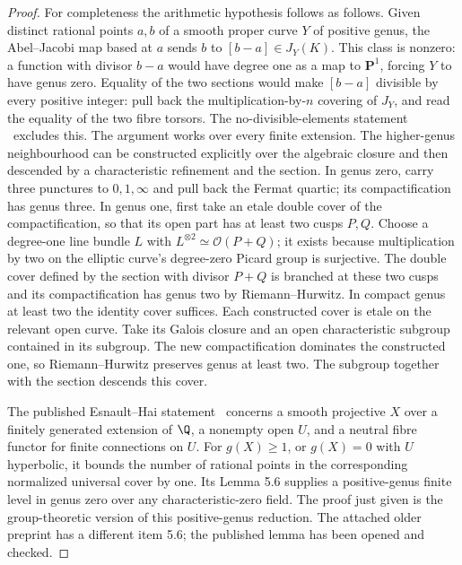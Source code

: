 \begin{proof}
For completeness the arithmetic hypothesis follows as follows. Given distinct rational points $a,b$ of a smooth proper curve $Y$ of positive genus, the Abel--Jacobi map based at $a$ sends $b$ to $[b-a]\in J_Y(K)$. This class is nonzero: a function with divisor $b-a$ would have degree one as a map to $\mathbf P^1$, forcing $Y$ to have genus zero. Equality of the two sections would make $[b-a]$ divisible by every positive integer: pull back the multiplication-by-$n$ covering of $J_Y$, and read the equality of the two fibre torsors. The no-divisible-elements statement \Arith\ excludes this. The argument works over every finite extension. The higher-genus neighbourhood can be constructed explicitly over the algebraic closure and then descended by a characteristic refinement and the section. In genus zero, carry three punctures to $0,1,\infty$ and pull back the Fermat quartic; its compactification has genus three. In genus one, first take an etale double cover of the compactification, so that its open part has at least two cusps $P,Q$. Choose a degree-one line bundle $L$ with $L^{\otimes2}\simeq\mathcal O(P+Q)$; it exists because multiplication by two on the elliptic curve's degree-zero Picard group is surjective. The double cover defined by the section with divisor $P+Q$ is branched at these two cusps and its compactification has genus two by Riemann--Hurwitz. In compact genus at least two the identity cover suffices. Each constructed cover is etale on the relevant open curve. Take its Galois closure and an open characteristic subgroup contained in its subgroup. The new compactification dominates the constructed one, so Riemann--Hurwitz preserves genus at least two. The subgroup together with the section descends this cover.

The published Esnault--Hai statement~\cite[Theorem 5.5]{EsnaultHai2008} concerns a smooth projective $X$ over a finitely generated extension of $\Q$, a nonempty open $U$, and a neutral fibre functor for finite connections on $U$. For $g(X)\ge1$, or $g(X)=0$ with $U$ hyperbolic, it bounds the number of rational points in the corresponding normalized universal cover by one. Its Lemma 5.6 supplies a positive-genus finite level in genus zero over any characteristic-zero field. The proof just given is the group-theoretic version of this positive-genus reduction. The attached older preprint has a different item 5.6; the published lemma has been opened and checked.
\end{proof}

